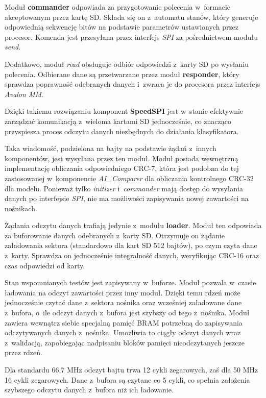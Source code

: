 Moduł \textbf{commander} odpowiada za przygotowanie polecenia w~formacie akceptowanym przez kartę SD. Składa się on z~automatu stanów, który generuje odpowiednią sekwencję bitów na podstawie parametrów ustawionych przez procesor. Komenda jest przesyłana przez interfejs \textit{SPI} za pośrednictwem modułu \textit{send}.

Dodatkowo, moduł \textit{read} obsługuje odbiór odpowiedzi z~karty SD po wysłaniu polecenia. Odbierane dane są przetwarzane przez moduł \textbf{responder}, który sprawdza poprawność odebranych danych i~zwraca je do procesora przez interfejs \textit{Avalon MM}.

Dzięki takiemu rozwiązaniu komponent \textbf{SpeedSPI} jest w~stanie efektywnie zarządzać komunikacją z~wieloma kartami SD jednocześnie, co znacząco przyspiesza proces odczytu danych niezbędnych do działania klasyfikatora.

Taka wiadomość, podzielona na bajty na podstawie żądań z~innych komponentów, jest wysyłana przez ten moduł. Moduł posiada wewnętrzną implementację obliczania odpowiedniego CRC-7, która jest podobna do tej zastosowanej w~komponencie \textit{AI\_Comparer} dla obliczania kontrolnego CRC-32 dla modelu. Ponieważ tylko \textit{initizer} i~\textit{commander} mają dostęp do wysyłania danych po interfejsie \textit{SPI}, nie ma możliwości zapisywania nowej zawartości na nośnikach.

Żądania odczytu danych trafiają jedynie z~modułu \textbf{loader}. Moduł ten odpowiada za buforowanie danych odebranych z~karty SD. Otrzymuje on żądanie załadowania sektora (standardowo dla kart SD 512 bajtów), po czym czyta dane z~karty. Sprawdza on jednocześnie integralność danych, weryfikując CRC-16 oraz czas odpowiedzi od karty.

Stan wspomnianych testów jest zapisywany w~buforze. Moduł pozwala w~czasie ładowania na odczyt zawartości przez inny moduł. Dzięki temu rdzeń może jednocześnie czytać dane z~sektora nośnika oraz wcześniej załadowane dane z~bufora, o~ile odczyt danych z~bufora jest szybszy od tego z~nośnika. Moduł zawiera wewnątrz siebie specjalną pamięć BRAM potrzebną do zapisywania odczytywanych danych z~nośnika. Umożliwia to ciągły odczyt danych wraz z~walidacją, zapobiegając nadpisaniu bloków pamięci nieodczytanych jeszcze przez rdzeń.

Dla standardu 66,7 MHz odczyt bajtu trwa 12 cykli zegarowych, zaś dla 50 MHz 16 cykli zegarowych. Dane z~bufora są czytane co 5 cykli, co spełnia założenia szybszego odczytu danych z~bufora niż ich ładowanie.

